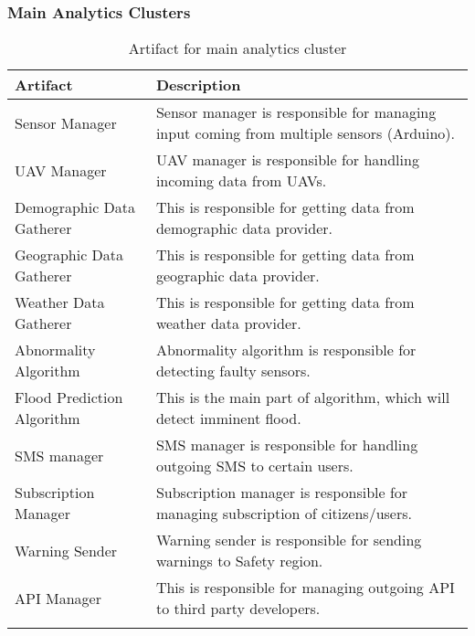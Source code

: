 \subsubsection*{Main Analytics Clusters}
\begin{longtable}{L{0.2\textwidth} L{0.6\textwidth}}
	\centering
	\textbf{Artifact}          & \textbf{Description}                                                                              \\ \toprule
	Sensor Manager             & Sensor manager is responsible for managing input 									coming from multiple sensors (Arduino). \\ \midrule
	\gls{UAV} Manager          & \gls{UAV} manager is responsible for handling incoming 							 data from \gls{UAV}s.              \\ \midrule
	Demographic Data Gatherer  & This is responsible for getting data from demographic 							data provider.                       \\ \midrule
	Geographic Data Gatherer   & This is responsible for getting data from geographic 								data provider.                       \\ \midrule
	Weather Data Gatherer      & This is responsible for getting data from weather data 							 provider.                          \\ \midrule
	Abnormality Algorithm      & Abnormality algorithm is responsible for detecting 								faulty sensors.                        \\ \midrule
	Flood Prediction Algorithm & This is the main part of algorithm, which will detect 							imminent flood.                      \\ \midrule
	SMS manager                & SMS manager is responsible for handling outgoing SMS 								to certain users.                    \\ \midrule
	Subscription Manager       & Subscription manager is responsible for managing 									subscription of citizens/users.         \\ \midrule
	Warning Sender             & Warning sender is responsible for sending warnings to 							Safety region.                       \\ \midrule
	API Manager                & This is responsible for managing outgoing API to third 							 party developers.                  \\ \bottomrule
	\caption{Artifact for main analytics cluster}
	\label{table:main-analytics-artifacts}
\end{longtable}


